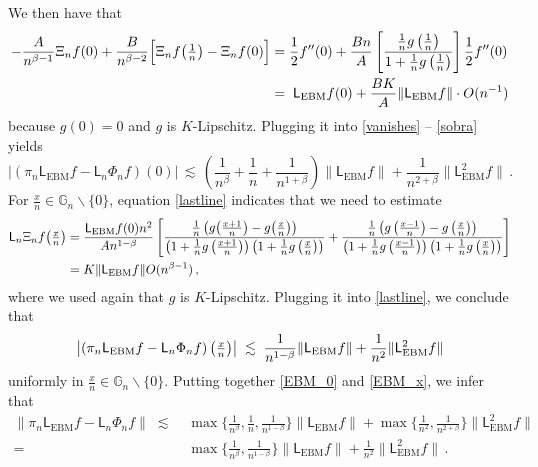 \documentclass[12pt,a4paper]{article}
\theoremstyle{plain}
\theoremstyle{remark}
\newcommand{\msf}[1]{{\mathsf #1}}
\newcommand{\bb}[1]{{\mathbb #1}}
\newcommand{\norm}[1]{\lVert#1\rVert}
\newcommand{\pfrac}[2]{\genfrac{}{}{}{1}{#1}{#2}}
\newcommand{\pn}[1]{\big(\pfrac{#1}{n}\big)}
\begin{document}
	We then have that
	\begin{align*}
		-\frac{A}{n^{\beta- 1}}\Xi_nf(0)+\frac{B}{n^{\beta - 2}}\Big[\Xi_nf\pn{1} - \Xi_nf(0)\Big]
		& = \frac12f''(0) + \frac{Bn}{A}\left[\frac{\frac{1}{n}g\left(\frac{1}{n}\right)}{1 + \frac{1}{n}g\left(\frac{1}{n}\right)}\right]\frac12f''(0)\\
		&=\; \msf{L}_{\text{EBM}}f(0) + \frac{BK}{A}\Vert \msf{L}_\text{EBM}f\Vert \cdot O(n^{-1})
	\end{align*}
	because $g(0) = 0$ and $g$ is $K$-Lipschitz. Plugging it into \eqref{vanishes} -- \eqref{sobra} yields
	\begin{equation}\label{EBM_0}
		\left|\left(\pi_n\msf{L}_{\text{EBM}}f-\msf{L}_n\Phi_nf \right)(0)\right|\,\lesssim\,\left(\frac{1}{n^\beta} +\frac{1}{n} +  \frac{1}{n^{1 + \beta}}\right)\norm{\msf{L}_{\text{EBM}}f} + \frac{1}{n^{2 + \beta}}\norm{\msf{L}^2_{\text{EBM}}f}\,.
	\end{equation}
	For $\frac{x}{n} \in \bb{G}_n \backslash \{0\}$, equation \eqref{lastline} indicates that we need to estimate
	\begin{align*}
		\msf{L}_n \Xi_nf\pn{x}
		&=\frac{\msf{L}_{\text{EBM}}f(0)n^2}{An^{1 - \beta}}\left[\frac{\frac{1}{n}\left(g\pn{x+1} - g\pn{x}\right)}{\left(1 + \frac{1}{n}g\left(\frac{x + 1}{n}\right)\right)\left(1 + \frac{1}{n}g\left(\frac{x}{n}\right)\right)}+\frac{\frac{1}{n}\left(g\left(\frac{x-1}{n}\right) - g\left(\frac{x}{n}\right)\right)}{\left(1 + \frac{1}{n}g\left(\frac{x - 1}{n}\right)\right)\left(1 + \frac{1}{n}g\left(\frac{x}{n}\right)\right)}\right]\\
		& = K\Vert \msf{L}_{\text{EBM}}f \Vert O(n^{\beta-1})\,,
	\end{align*}
	where we used again that  $g$ is $K$-Lipschitz. Plugging it into   \eqref{lastline}, we conclude that
	\begin{equation}\label{EBM_x}
		\left|\left(\pi_n\msf{L}_\text{EBM}f-\msf{L}_n\Phi_nf \right)\pn{x}\right|\;\lesssim\;\frac{1}{n^{1-\beta}}\norm{\msf{L}_{\text{EBM}}f} + \frac{1}{n^2}\norm{\msf{L}^2_{\text{EBM}}f}
	\end{equation}
	uniformly in $\frac{x}{n} \in \bb{G}_n \backslash\{0\}$.
	Putting together \eqref{EBM_0} and \eqref{EBM_x}, we infer that
	\begin{equation}\label{EBM1}
		\begin{split}
			\norm{\pi_n\msf{L}_{\text{EBM}}f -\msf{L}_n\Phi_nf } \;\lesssim\;& \max \Big\{\frac{1}{n^\beta},\frac{1}{n}, \frac{1}{n^{1-\beta}}\Big\} \norm{\msf{L}_{\text{EBM}}f}  +\max\Big\{\frac{1}{n^2}, \frac{1}{n^{2+\beta}}\Big\} \norm{\msf{L}^2_{\text{EBM}}f}\\
			=\; &   \max \Big\{\frac{1}{n^\beta}, \frac{1}{n^{1-\beta}}\Big\} \norm{\msf{L}_{\text{EBM}}f} + \frac{1}{n^2} \norm{\msf{L}^2_{\text{EBM}}f}\,.
		\end{split}
	\end{equation}
\end{document}
